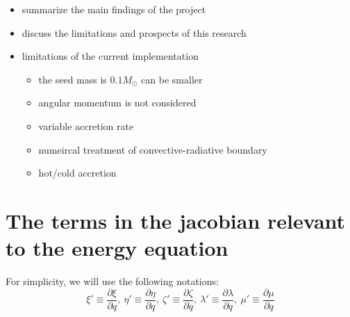 \documentclass[12pt,a4paper]{article}
\newcommand{\pfird}[2][]{\frac{\partial#1}{\partial#2}}
\newenvironment{outline}[1]{%
  \begin{itemize}[label=\textbullet]%
  \color{#1}%
}{%
  \end{itemize}%
}
\begin{document}
\begin{outline}{gray}
  \item summarize the main findings of the project
  \item discuss the limitations and prospects of this research
  \item limitations of the current implementation
  \begin{itemize}
    \item the seed mass is $0.1 M_\odot$ can be smaller
    \item angular momentum is not considered
    \item variable accretion rate
    \item numeircal treatment of convective-radiative boundary
    \item hot/cold accretion
  \end{itemize}
\end{outline}


\newpage
\printbibliography[heading=bibintoc, title={References}]

\newpage
{}
\appendix

\section*{The terms in the jacobian relevant to the energy equation}
\label{app:jacobian}
\renewcommand{\theequation}{A.\arabic{equation}}
\setcounter{equation}{0}

For simplicity, we will use the following notations:
\begin{equation}
  \xi' \equiv \pfird[\xi]{q},\ \eta' \equiv \pfird[\eta]{q},\ \zeta' \equiv \pfird[\zeta]{q},\ \lambda' \equiv \pfird[\lambda]{q},\ \mu' \equiv \pfird[\mu]{q}
\end{equation}
\end{document}
